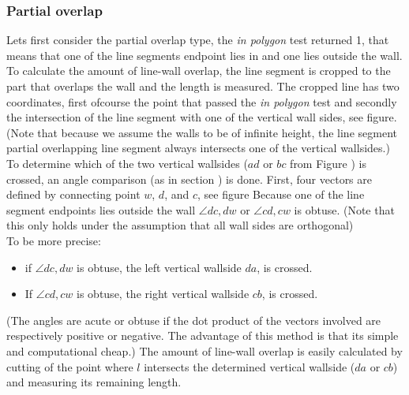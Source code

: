 \documentclass[10pt]{article}
\begin{document}
	\subsubsection{Partial overlap}
	Lets first consider the partial overlap type, the \emph{in polygon} test
	returned 1, that means that one of the line segments endpoint lies in
	and one lies outside the wall.
	To calculate the amount of line-wall overlap, the line segment is cropped to the
	part that overlaps the wall and the length is measured. 
	The cropped line has two coordinates, first ofcourse the point that passed
	the \emph{in polygon} test and secondly the intersection of the line
	segment with one of the vertical wall sides, see figure. %
	(Note that because we assume the walls to be of infinite height, the line
	segment partial overlapping line segment always intersects one of the
	vertical wallsides.)
	To determine which of the two vertical wallsides ($ad$ or $bc$ from Figure
	)
	 is crossed, an angle comparison (as in section %
	 ) is done.
	First, four vectors are defined by connecting point $w$, $d$, and $c$, see figure %
	Because one of the line segment endpoints lies outside
	the wall $\angle dc, dw$ or $\angle cd, cw$ is obtuse. 
	(Note that this only holds under the assumption that all wall sides are orthogonal)\\
	To be more precise: 
	\begin{itemize}
	\item if $\angle dc, dw$ is obtuse, the left vertical wallside $da$, is
	crossed. \\
	\item If $\angle cd, cw$ is obtuse, the right vertical wallside $cb$, is
	crossed. \\
	\end{itemize}
	(The angles are acute or obtuse if the dot product of the vectors involved
	are respectively positive or negative. The advantage of this method is that
	its simple and computational cheap.)
	The amount of line-wall overlap is easily calculated by cutting of the
	point where $l$ intersects the determined vertical wallside ($da$ or
	$cb$) and measuring its remaining length.
\end{document}

